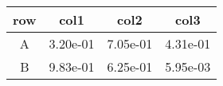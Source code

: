 \begin{tabular}{cccc}
\toprule
row&col1&col2&col3\tabularnewline
\midrule
A&3.20e-01&7.05e-01&4.31e-01\tabularnewline
B&9.83e-01&6.25e-01&5.95e-03\tabularnewline
\bottomrule
\end{tabular}

